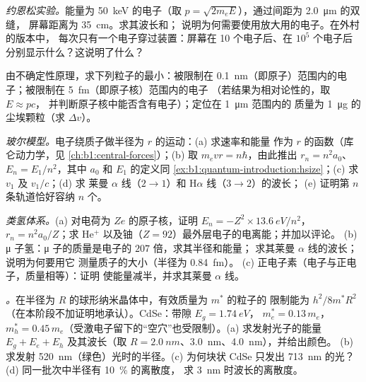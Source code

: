 \begin{exercise}[$\star\star$]\label{exo:b1:quantum-introduction:7}
\emph{约恩松实验。}能量为 \qty{50}{keV} 的电子（取 $p =
\sqrt{2m_eE}$），通过间距为 \qty{2.0}{\micro m} 的双缝，
屏幕距离为 \qty{35}{cm}。求其波长和；
说明为何需要使用放大用的电子。在外村的版本中，
每次只有一个电子穿过装置：屏幕在 10 个电子后、在 $10^5$ 个电子后
分别显示什么？这说明了什么？
\end{exercise}

\begin{exercise}[$\star\star$]\label{exo:b1:quantum-introduction:8}
由不确定性原理，求下列粒子的最小：被限制在
\qty{0.1}{nm}（即原子）范围内的电子；被限制在 \qty{5}{fm}（即原子核）范围内的电子
（若结果为相对论性的，取 $E \approx pc$，
并判断原子核中能否含有电子）；定位在 \qty{1}{\micro m} 范围内的
质量为 \qty{1}{\micro g} 的尘埃颗粒（求 $\Delta v$）。
\end{exercise}

\begin{exercise}[$\star\star$]\label{exo:b1:quantum-introduction:9}
\emph{玻尔模型。}电子绕质子做半径为 $r$ 的运动：(a) 求速率和能量
作为 $r$ 的函数（库仑动力学，见
\cref{ch:b1:central-forces}）；(b) 取 $m_evr = n\hbar$，由此推出
$r_n = n^2a_0$、$E_n = E_1/n^2$，其中 $a_0$ 和 $E_1$ 的定义同
\cref{ex:b1:quantum-introduction:hsize}；(c) 求 $v_1$ 及 $v_1/c$；(d) 求
莱曼 $\alpha$ 线（$2 \to 1$）和 H$\alpha$ 线（$3 \to 2$）的波长；
(e) 证明第 $n$ 条轨道恰好容纳 $n$ 个。
\end{exercise}

\begin{exercise}[$\star\star\star$]\label{exo:b1:quantum-introduction:10}
\emph{类氢体系。}(a) 对电荷为 $Ze$ 的原子核，证明
$E_n = -Z^2 \times \qty{13.6}{eV}/n^2$，$r_n = n^2a_0/Z$；求
He$^+$ 以及铀（$Z = 92$）最外层电子的电离能；并加以评论。
(b) μ 子氢：μ 子的质量是电子的 $207$ 倍，求其半径和能量；
求其莱曼 $\alpha$ 线的波长；说明为何要用它
测量质子的大小（半径为 \qty{0.84}{fm}）。
(c) 正电子素（电子与正电子，质量相等）：证明
使能量减半，并求其莱曼 $\alpha$ 线。
\end{exercise}

\begin{exercise}[$\star\star\star$]\label{exo:b1:quantum-introduction:11}
\emph{。}在半径为 $R$ 的球形纳米晶体中，有效质量为 $m^\ast$ 的粒子的
限制能为 $h^2/8m^\ast R^2$（在本阶段不加证明地承认）。CdSe：带隙 $E_g = \qty{1.74}{eV}$，
$m_e^\ast =
0.13\,m_e$，$m_h^\ast = 0.45\,m_e$（受激电子留下的“空穴”也受限制）。(a) 求发射光子的能量
$E_g + E_e + E_h$ 及其波长（取 $R = \qty{2.0}{nm}$、\qty{3.0}{nm}、\qty{4.0}{nm}），并给出颜色。
(b) 求发射 \qty{520}{nm}（绿色）光时的半径。(c) 为何块状 CdSe
只发出 \qty{713}{nm} 的光？(d) 同一批次中半径有 \qty{10}{\percent} 的离散度，
求 \qty{3}{nm} 时波长的离散度。
%
\end{exercise}

